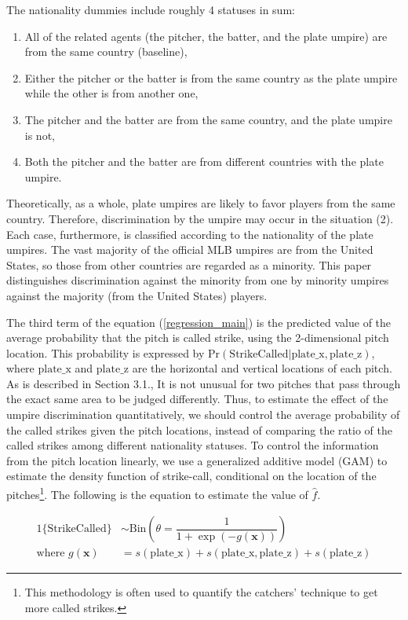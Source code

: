 \documentclass[dvipdfmx, 12pt]{jsarticle}
\begin{document}
The nationality dummies include roughly 4 statuses in sum:
\begin{enumerate}
  \item All of the related agents (the pitcher, the batter, and the plate umpire) are from the same country (baseline),
  \item Either the pitcher or the batter is from the same country as the plate umpire while the other is from another one,
  \item The pitcher and the batter are from the same country, and the plate umpire is not,
  \item Both the pitcher and the batter are from different countries with the plate umpire.
\end{enumerate}

Theoretically, as a whole, plate umpires are likely to favor players from the same country. Therefore, discrimination by the umpire may occur in the situation (2). Each case, furthermore, is classified according to the nationality of the plate umpires. The vast majority of the official MLB umpires are from the United States,  so those from other countries are regarded as a minority. This paper distinguishes discrimination against the minority from one by minority umpires against the majority (from the United States) players.

The third term of the equation (\ref{regression_main}) is the predicted value of the average probability that the pitch is called strike, using the 2-dimensional pitch location. This probability is expressed by $\text{Pr}(\text{StrikeCalled} |\text{plate\_x}, \text{plate\_z})$, where $\text{plate\_x}$ and $\text{plate\_z}$ are the horizontal and vertical locations of each pitch. As is described in Section 3.1., It is not unusual for two pitches that pass through the exact same area to be judged differently. Thus, to estimate the effect of the umpire discrimination quantitatively, we should control the average probability of the called strikes given the pitch locations, instead of comparing the ratio of the called strikes among different nationality statuses. To control the information from the pitch location linearly, we use a generalized additive model (GAM) to estimate the density function of strike-call, conditional on the location of the pitches\footnote{This methodology is often used to quantify the catchers' technique to get more called strikes.}. The following is the equation to estimate the value of $\hat{f}$.

\begin{align}
  1\{\text{StrikeCalled}\} & \sim \text{Bin}\left( \theta = \dfrac{1}{1 + \exp(-g(\mathbf{x}))}\right) \label{logit} \\
  \text{where } g(\mathbf{x}) & = s(\text{plate\_x}) + s(\text{plate\_x}, \text{plate\_z}) + s(\text{plate\_z}) \label{spline}
\end{align}
\end{document}
